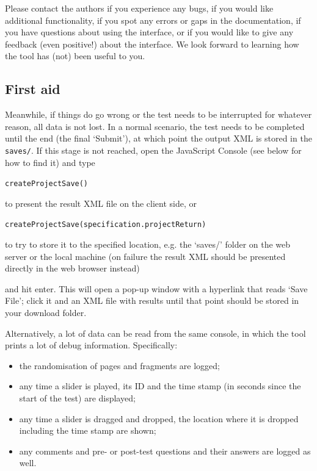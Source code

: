 \documentclass[11pt, oneside]{article}   	%
\begin{document}
	Please contact the authors if you experience any bugs, if you would like additional functionality, if you spot any errors or gaps in the documentation, if you have questions about using the interface, or if you would like to give any feedback (even positive!) about the interface. We look forward to learning how the tool has (not) been useful to you. 


	\subsection{First aid}
		Meanwhile, if things do go wrong or the test needs to be interrupted for whatever reason, all data is not lost. In a normal scenario, the test needs to be completed until the end (the final `Submit'), at which point the output XML is stored in the \texttt{saves/}. If this stage is not reached, open the JavaScript Console (see below for how to find it) and type 

		\texttt{createProjectSave()}

		to present the result XML file on the client side, or

		\texttt{createProjectSave(specification.projectReturn)}

		to try to store it to the specified location, e.g. the `saves/' folder on the web server or the local machine (on failure the result XML should be presented directly in the web browser instead)

		and hit enter. This will open a pop-up window with a hyperlink that reads `Save File'; click it and an XML file with results until that point should be stored in your download folder. 
		
		Alternatively, a lot of data can be read from the same console, in which the tool prints a lot of debug information. Specifically:
	    	\begin{itemize}
	        	\item the randomisation of pages and fragments are logged;
	        	\item any time a slider is played, its ID and the time stamp (in seconds since the start of the test) are displayed;
	        	\item any time a slider is dragged and dropped, the location where it is dropped including the time stamp are shown; 
	        	\item any comments and pre- or post-test questions and their answers are logged as well. 
	    	\end{itemize}
\end{document}
